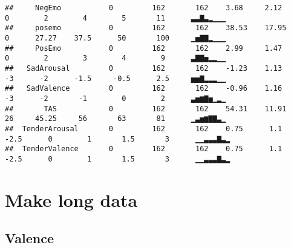 \documentclass[]{article}
\newenvironment{Shaded}{\begin{snugshade}}{\end{snugshade}}
\newcommand{\DataTypeTok}[1]{\textcolor[rgb]{0.13,0.29,0.53}{#1}}
\newcommand{\KeywordTok}[1]{\textcolor[rgb]{0.13,0.29,0.53}{\textbf{#1}}}
\newcommand{\NormalTok}[1]{#1}
\newcommand{\OperatorTok}[1]{\textcolor[rgb]{0.81,0.36,0.00}{\textbf{#1}}}
\newcommand{\OtherTok}[1]{\textcolor[rgb]{0.56,0.35,0.01}{#1}}
\newcommand{\StringTok}[1]{\textcolor[rgb]{0.31,0.60,0.02}{#1}}
\begin{document}
\begin{verbatim}
##     NegEmo           0         162       162    3.68     2.12      0        2        4        5       11      ▃▃▇▃▂▁▁▁ 
##     posemo           0         162       162    38.53    17.95     0      27.27    37.5      50       100     ▁▅▇▇▂▁▁▁ 
##     PosEmo           0         162       162    2.99     1.47      0        2        3        4        9      ▃▇▇▅▂▂▁▁ 
##   SadArousal         0         162       162    -1.23    1.13      -3      -2      -1.5     -0.5      2.5     ▅▅▇▂▂▂▁▁ 
##   SadValence         0         162       162    -0.96    1.16      -3      -2       -1        0        2      ▃▅▆▇▅▁▂▁ 
##       TAS            0         162       162    54.31    11.91     26     45.25     56       63       81      ▁▃▅▆▇▇▃▁ 
##  TenderArousal       0         162       162    0.75      1.1     -2.5      0        1       1.5       3      ▁▁▃▃▃▇▃▂ 
##  TenderValence       0         162       162    0.75      1.1     -2.5      0        1       1.5       3      ▁▁▃▃▃▇▃▂
\end{verbatim}

\hypertarget{make-long-data}{%
\section{Make long data}\label{make-long-data}}

\hypertarget{valence}{%
\subsection{Valence}\label{valence}}

\begin{Shaded}
\end{Shaded}
\end{document}
